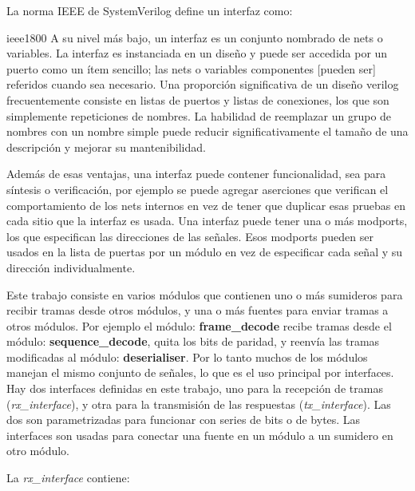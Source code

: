 \documentclass[a4paper, twoside, 11pt]{report}
\begin{document}
La norma IEEE de SystemVerilog define un interfaz como:

\begin{displaycquote}{ieee1800}
A su nivel más bajo, un interfaz es un conjunto nombrado de nets o variables. La interfaz es instanciada en un diseño y puede ser accedida por un puerto como un ítem sencillo; las nets o variables componentes [pueden ser] referidos cuando sea necesario. Una proporción significativa de un diseño verilog frecuentemente consiste en listas de puertos y listas de conexiones, los que son simplemente repeticiones de nombres. La habilidad de reemplazar un grupo de nombres con un nombre simple puede reducir significativamente el tamaño de una descripción y mejorar su mantenibilidad.
\end{displaycquote}

Además de esas ventajas, una interfaz puede contener funcionalidad, sea para síntesis o verificación, por ejemplo se puede agregar aserciones que verifican el comportamiento de los nets internos en vez de tener que duplicar esas pruebas en cada sitio que la interfaz es usada. Una interfaz puede tener una o más modports, los que especifican las direcciones de las señales. Esos modports pueden ser usados en la lista de puertas por un módulo en vez de especificar cada señal y su dirección individualmente.

Este trabajo consiste en varios módulos que contienen uno o más sumideros para recibir tramas desde otros módulos, y una o más fuentes para enviar tramas a otros módulos. Por ejemplo el módulo: \textbf{frame\_decode} recibe tramas desde el módulo: \textbf{sequence\_decode}, quita los bits de paridad, y reenvía las tramas modificadas al módulo: \textbf{deserialiser}. Por lo tanto muchos de los módulos manejan el mismo conjunto de señales, lo que es el uso principal por interfaces. Hay dos interfaces definidas en este trabajo, uno para la recepción de tramas (\textit{rx\_interface}), y otra para la transmisión de las respuestas (\textit{tx\_interface}). Las dos son parametrizadas para funcionar con series de bits o de bytes. Las interfaces son usadas para conectar una fuente en un módulo a un sumidero en otro módulo.

La \textit{rx\_interface} contiene:
\end{document}
